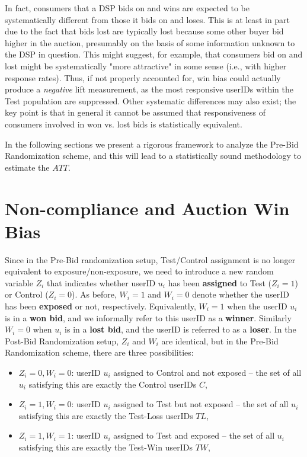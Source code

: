 \documentclass[11pt,a4paper]{article}
\theoremstyle{definition}
\theoremstyle{remark}
\theoremstyle{definition}
\theoremstyle{definition}
\theoremstyle{definition}
\theoremstyle{definition}
\theoremstyle{definition}
\theoremstyle{definition}
\begin{document}
In fact, consumers that a DSP bids on and wins are expected to be systematically different from those it bids on and loses. This is at least in part due to the fact that bids lost are typically lost because some other buyer bid higher in the auction, presumably on the basis of some information unknown to the DSP in question. This might suggest, for example, that consumers bid on and lost might be systematically "more attractive" in some sense (i.e., with higher response rates). Thus, if not properly accounted for, win bias could actually produce a {\em negative} lift measurement, as the most responsive userIDs within the Test population are suppressed. Other systematic differences may also exist; the key point is that in general it cannot be assumed that responsiveness of consumers involved in won vs. lost bids is statistically equivalent.

In the following sections we present a rigorous framework to analyze the Pre-Bid Randomization scheme, and this will lead to a statistically sound methodology to estimate the $ATT$.

\section{Non-compliance and Auction Win Bias} \label{sec-win-bias}

Since in the Pre-Bid randomization setup, Test/Control assignment is no longer equivalent to exposure/non-exposure, we need to introduce a new random variable $Z_i$ that indicates whether userID $u_i$ has been {\bf assigned} to Test ($Z_i=1$) or Control ($Z_i=0$). As before, $W_i = 1$ and $W_i = 0$ denote whether the userID has been \textbf{exposed} or not, respectively. Equivalently, $W_i=1$ when the userID $u_i$ is in a \textbf{won bid}, and we informally refer to this userID as a \textbf{winner}. Similarly $W_i=0$ when $u_i$ is in a \textbf{lost bid}, and the userID is referred to as a \textbf{loser}. In the Post-Bid Randomization setup, $Z_i$ and $W_i$ are identical, but in the Pre-Bid Randomization scheme, there are three possibilities:
\begin{itemize}
	\item $Z_i = 0, W_i = 0$: userID $u_i$ assigned to Control and not exposed -- the set of all $u_i$ satisfying this are exactly the Control userIDs $C$,
	\item $Z_i = 1, W_i = 0$: userID $u_i$ assigned to Test but not exposed --  the set of all $u_i$ satisfying this are exactly the Test-Loss userIDs $TL$,
	\item $Z_i = 1, W_i = 1$: userID $u_i$ assigned to Test and exposed --  the set of all $u_i$ satisfying this are exactly the Test-Win userIDs $TW$,
\end{itemize}
\end{document}
